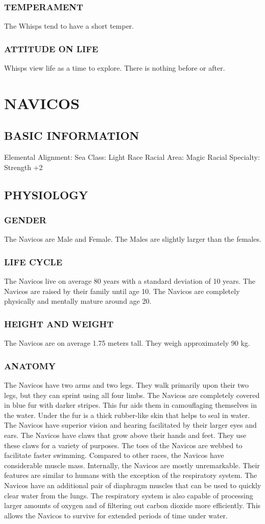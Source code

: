 \subsubsection{TEMPERAMENT}
The Whisps tend to have a short temper.
\subsubsection{ATTITUDE ON LIFE}
Whisps view life as a time to explore.  There is nothing before or after.
\section{NAVICOS}
\subsection{BASIC INFORMATION}
Elemental Alignment: Sea
Class: Light Race
Racial Area: Magic
Racial Specialty: Strength +2
\subsection{PHYSIOLOGY}
\subsubsection{GENDER}
The Navicos are Male and Female.  The Males are slightly larger than the females.
\subsubsection{LIFE CYCLE}
The Navicos live on average 80 years with a standard deviation of 10 years.  The Navicos are raised by their family until age 10.  The Navicos are completely physically and mentally mature around age 20.
\subsubsection{HEIGHT AND WEIGHT}
The Navicos are on average 1.75 meters tall.  They weigh approximately 90 kg.
\subsubsection{ANATOMY}
The Navicos have two arms and two legs.  They walk primarily upon their two legs, but they can sprint using all four limbs. The Navicos are completely covered in blue fur with darker stripes.  This fur aids them in camouflaging themselves in the water.  Under the fur is a thick rubber-like skin that helps to seal in water.  The Navicos have superior vision and hearing facilitated by their larger eyes and ears.  The Navicos have claws that grow above their hands and feet.  They use these claws for a variety of purposes.  The toes of the Navicos are webbed to facilitate faster swimming. Compared to other races, the Navicos have considerable muscle mass. Internally, the Navicos are mostly unremarkable.  Their features are similar to humans with the exception of the respiratory system.  The Navicos have an additional pair of diaphragm muscles that can be used to quickly clear water from the lungs.  The respiratory system is also capable of processing larger amounts of oxygen and of filtering out carbon dioxide more efficiently.  This allows the Navicos to survive for extended periods of time under water.
